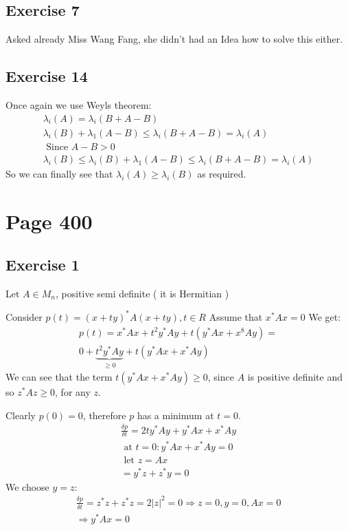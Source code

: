 \subsection{Exercise 7}
Asked already Miss Wang Fang, she didn't had an Idea how to solve this either.
\subsection{Exercise 14}
Once again we use Weyls theorem:
\begin{gather*}
\lambda_i(A) = \lambda_i(B+A-B)\\
\lambda_i(B) + \lambda_1 (A-B) \leq \lambda_i(B+A-B) = \lambda_i(A)\\
\text{ Since } A-B > 0 \\
\lambda_i(B) \leq \lambda_i(B) + \lambda_1 (A-B) \leq \lambda_i(B+A-B) = \lambda_i(A)
\end{gather*}
So we can finally see that $\lambda_i(A) \geq \lambda_i(B)$ as required.

\section{Page 400}
\subsection{Exercise 1}
Let $A \in M_n$, positive semi definite ( it is Hermitian )

Consider $p(t) = (x+ ty)^* A (x+ty) , t\in R$
Assume that $x^* Ax = 0$
We get:
\begin{gather*}
p(t) = x^* A x + t^2 y^* A y + t( y^* Ax + x^8 Ay ) = \\
0 + \underbrace{t^2 y^* A y}_{\geq 0} + t ( y^* Ax + x^* A y ) 
\end{gather*}
We can see that the term $t ( y^* Ax + x^* A y ) \geq 0$, since $A$ is positive definite and so $z^*Az \geq 0$, for any $z$.

Clearly $p(0) =0$, therefore $p$ has a minimum at $t=0$.
\begin{gather*}
\frac{\delta p}{\delta t} = 2 t y^* Ay + y^* Ax + x^* A y\\
\text{ at } t = 0 : y^* A x + x^* A y = 0 \\
\text{ let } z = Ax\\
= y^* z + z^* y = 0
\end{gather*}
We choose $y = z$:
\begin{gather*}
\frac{\delta p}{\delta t} =  z^*z + z^* z = 2 | z | ^2 = 0 \Rightarrow z =0 , y =0 ,  Ax = 0 \\
\Rightarrow y^* Ax = 0
\end{gather*}

